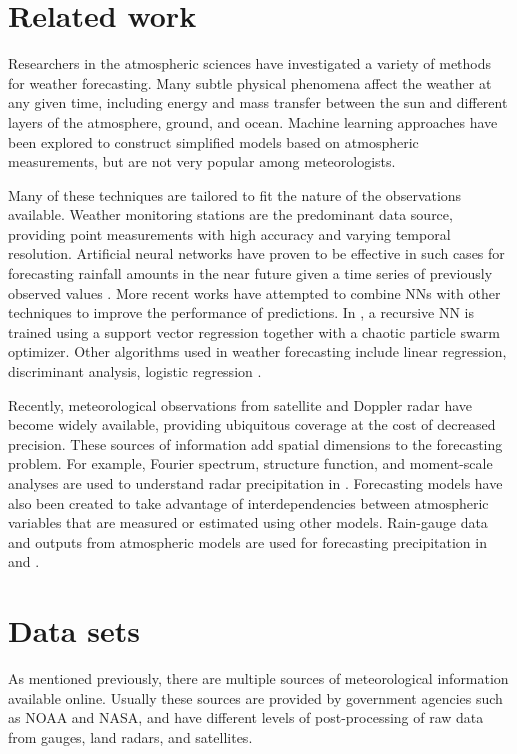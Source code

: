\documentclass{article}
\begin{document}
\section{Related work} 
 
Researchers in the atmospheric sciences have investigated a variety of methods for weather forecasting. Many subtle physical phenomena affect the weather at any given time, including energy and mass transfer between the sun and different layers of the atmosphere, ground, and ocean. Machine learning approaches have been explored to construct simplified models based on atmospheric measurements, but are not very popular among meteorologists.

Many of these techniques are tailored to fit the nature of the observations available. Weather monitoring stations are the predominant data source, providing point measurements with high accuracy and varying temporal resolution. Artificial neural networks have proven to be effective in such cases for forecasting rainfall amounts in the near future given a time series of previously observed values \cite{maier2000}. More recent works have attempted to combine NNs with other techniques to improve the performance of predictions. In \cite{hong2008}, a recursive NN is trained using a support vector regression together with a chaotic particle swarm optimizer. Other algorithms used in weather forecasting include linear regression, discriminant analysis, logistic regression \cite{applequist2002}.

Recently, meteorological observations from satellite and Doppler radar have become widely available, providing ubiquitous coverage at the cost of decreased precision. These sources of information add spatial dimensions to the forecasting problem. For example, Fourier spectrum, structure function, and moment-scale analyses are used to understand radar precipitation in \cite{harris2007}. Forecasting models have also been created to take advantage of interdependencies between atmospheric variables that are measured or estimated using other models. Rain-gauge data and outputs from atmospheric models are used for forecasting precipitation in \cite{kuligowski1998} and \cite{ramirez2005}.

\section{Data sets}

As mentioned previously, there are multiple sources of meteorological information available online. Usually these sources are provided by government agencies such as NOAA and NASA, and have different levels of post-processing of raw data from gauges, land radars, and satellites.
\end{document}
